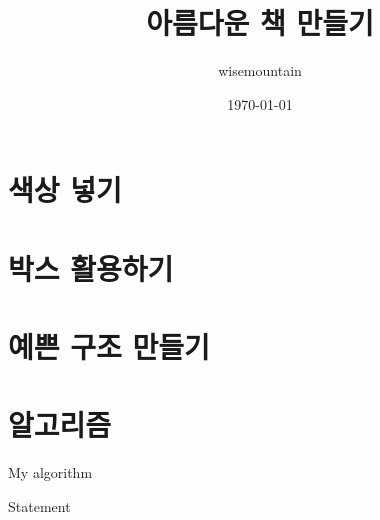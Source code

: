 \documentclass[ %
    a4paper,    %
    amsmath,    %
    itemph,     %
]{oblivoir}     %
\begin{document}
\title{아름다운 책 만들기}
\author{wisemountain}
\date{\today}

\maketitle

\newpage

\tableofcontents

\newpage

\section{색상 넣기}


\section{박스 활용하기}


\section{예쁜 구조 만들기}

\section{알고리즘} 

\begin{algorithm}
\caption{My algorithm}
\begin{algorithmic}[1]
  \scriptsize
  \STATE Statement
\end{algorithmic}
\end{algorithm}
\end{document}
